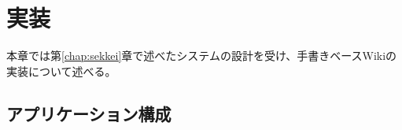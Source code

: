 \chapter{実装}
\label{chap:jissou}

本章では第\ref{chap:sekkei}章で述べたシステムの設計を受け、手書きベースWikiの実装について述べる。

\newpage

\section{アプリケーション構成}
